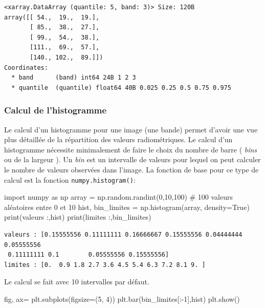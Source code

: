 \documentclass[
  french,
  11pt,
  letterpaper,
  open=any,
  twoside=false,
  french]{scrbook}
\newenvironment{Shaded}{\begin{snugshade}}{\end{snugshade}}
\newcommand{\BuiltInTok}[1]{\textcolor[rgb]{0.00,0.23,0.31}{#1}}
\newcommand{\CommentTok}[1]{\textcolor[rgb]{0.37,0.37,0.37}{#1}}
\newcommand{\DecValTok}[1]{\textcolor[rgb]{0.68,0.00,0.00}{#1}}
\newcommand{\ImportTok}[1]{\textcolor[rgb]{0.00,0.46,0.62}{#1}}
\newcommand{\NormalTok}[1]{\textcolor[rgb]{0.00,0.23,0.31}{#1}}
\newcommand{\OperatorTok}[1]{\textcolor[rgb]{0.37,0.37,0.37}{#1}}
\newcommand{\StringTok}[1]{\textcolor[rgb]{0.13,0.47,0.30}{#1}}
\newcommand{\VariableTok}[1]{\textcolor[rgb]{0.07,0.07,0.07}{#1}}
\begin{document}
\begin{verbatim}
<xarray.DataArray (quantile: 5, band: 3)> Size: 120B
array([[ 54.,  19.,  19.],
       [ 85.,  38.,  27.],
       [ 99.,  54.,  38.],
       [111.,  69.,  57.],
       [140., 102.,  89.]])
Coordinates:
  * band      (band) int64 24B 1 2 3
  * quantile  (quantile) float64 40B 0.025 0.25 0.5 0.75 0.975
\end{verbatim}

\subsubsection{Calcul de l'histogramme}\label{calcul-de-lhistogramme}

Le calcul d'un histogramme pour une image (une bande) permet d'avoir une
vue plus détaillée de la répartition des valeurs radiométriques. Le
calcul d'un histogramme nécessite minimalement de faire le choix du
nombre de barre ( \emph{bins} ou de la largeur ). Un \emph{bin} est un
intervalle de valeurs pour lequel on peut calculer le nombre de valeurs
observées dans l'image. La fonction de base pour ce type de calcul est
la fonction \texttt{numpy.histogram()}:

\begin{Shaded}
\begin{Highlighting}[]
\ImportTok{import}\NormalTok{ numpy }\ImportTok{as}\NormalTok{ np}
\NormalTok{array }\OperatorTok{=}\NormalTok{ np.random.randint(}\DecValTok{0}\NormalTok{,}\DecValTok{10}\NormalTok{,}\DecValTok{100}\NormalTok{) }\CommentTok{\# 100 valeurs aléatoires entre 0 et 10}
\NormalTok{hist, bin\_limites }\OperatorTok{=}\NormalTok{ np.histogram(array, density}\OperatorTok{=}\VariableTok{True}\NormalTok{)}
\BuiltInTok{print}\NormalTok{(}\StringTok{\textquotesingle{}valeurs :\textquotesingle{}}\NormalTok{,hist)}
\BuiltInTok{print}\NormalTok{(}\StringTok{\textquotesingle{}limites :\textquotesingle{}}\NormalTok{,bin\_limites)}
\end{Highlighting}
\end{Shaded}

\begin{verbatim}
valeurs : [0.15555556 0.11111111 0.16666667 0.15555556 0.04444444 0.05555556
 0.11111111 0.1        0.05555556 0.15555556]
limites : [0.  0.9 1.8 2.7 3.6 4.5 5.4 6.3 7.2 8.1 9. ]
\end{verbatim}

Le calcul se fait avec 10 intervalles par défaut.

\begin{Shaded}
\begin{Highlighting}[]
\NormalTok{fig, ax}\OperatorTok{=}\NormalTok{ plt.subplots(figsize}\OperatorTok{=}\NormalTok{(}\DecValTok{5}\NormalTok{, }\DecValTok{4}\NormalTok{))}
\NormalTok{plt.bar(bin\_limites[:}\OperatorTok{{-}}\DecValTok{1}\NormalTok{],hist)}
\NormalTok{plt.show()}
\end{Highlighting}
\end{Shaded}
\end{document}

